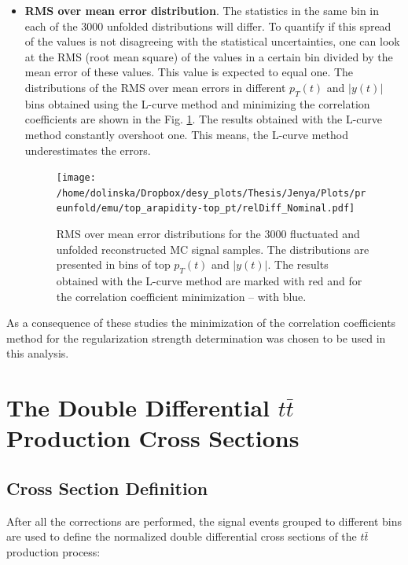 \begin{itemize}
 \item \textbf{RMS over mean error distribution}. The statistics in the same bin in each of the 3000 unfolded
 distributions will differ. To quantify if this spread of the values is not disagreeing with the statistical uncertainties, one can look at the 
 RMS (root mean square) of the values in a certain bin divided by the mean error of these values. This value is expected to equal one.
 The distributions of the RMS over mean errors in different $p_{T}(t)$ and $|y(t)|$ bins obtained using the L-curve method and minimizing the 
 correlation coefficients are shown in the Fig. \ref{fig:RMSovMeanErr}. The results obtained with the L-curve method
 constantly overshoot one. This means, the L-curve method underestimates the errors.
 \begin{figure}[h]
  \centering
  \texttt{[image: /home/dolinska/Dropbox/desy\_plots/Thesis/Jenya/Plots/preunfold/emu/top\_arapidity-top\_pt/relDiff\_Nominal.pdf]}
  \caption{RMS over mean error distributions for the 3000 fluctuated and unfolded reconstructed MC signal samples. The distributions are
         presented in bins of top $p_{T}(t)$ and $|y(t)|$. The results obtained with the L-curve method are marked with red and 
         for the correlation coefficient minimization -- with blue.}
  \label{fig:RMSovMeanErr}
 \end{figure}

\end{itemize}

As a consequence of these studies the minimization of the correlation coefficients method for the regularization strength determination was chosen
to be used in this analysis.

\section{The Double Differential $t\bar{t}$ Production Cross Sections}

\subsection{Cross Section Definition}\label{ssec:xsec_def}

After all the corrections are performed, the signal events grouped to different bins are used to define the normalized double differential cross sections
of the $t\bar{t}$ production process:

